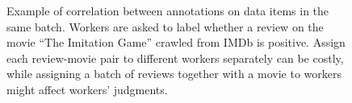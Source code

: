 \begin{figure}[!t]
{\begin{tabular}{@{}c@{}}
    \end{tabular}
  }
  \caption{\label{fig:example}
  Example of correlation between annotations on data items in the same batch.
  Workers are asked to label whether a review on the movie ``The Imitation Game'' crawled from IMDb is positive.
  Assign each review-movie pair to different workers separately can be costly,
  while assigning a batch of reviews together with a movie to workers might affect workers' judgments.
  }
\end{figure}




